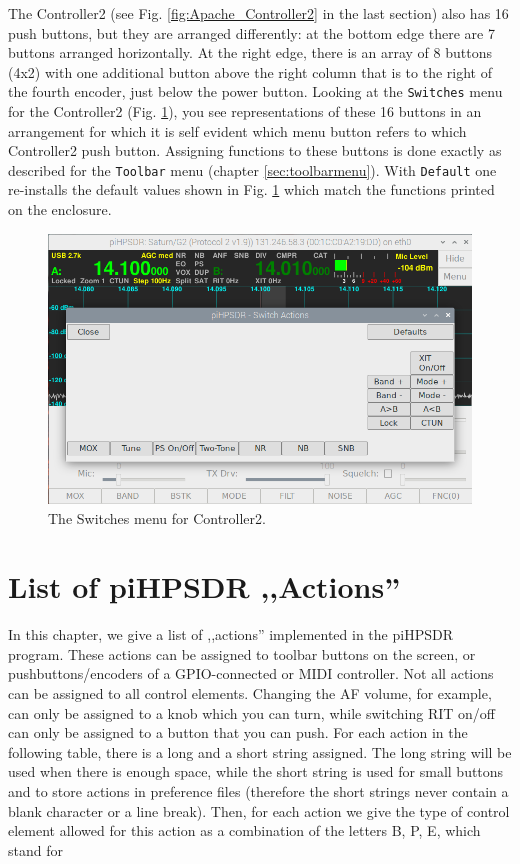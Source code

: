 \documentclass[12pt]{book}
\def\rett#1{\texttt{\color{red}#1}}
\def\bltt#1{\texttt{\color{blue}#1}}
\begin{document}
The Controller2 (see Fig. \ref{fig:Apache_Controller2} in the last section)
also has 16 push buttons, but they are arranged differently:
at the bottom edge there are 7 buttons arranged horizontally. At the right
edge, there is an array of 8 buttons (4x2) with one additional button
above the right column that is to the right of the fourth encoder, just
below the power button. Looking at the \bltt{Switches} menu for the
Controller2 (Fig. \ref{fig:SwitchMenuV2}), you see representations of
these 16 buttons in an arrangement for which it is self evident which
menu button refers to which Controller2 push button.
Assigning functions
to these buttons is done exactly as described for the \bltt{Toolbar} menu
(chapter \ref{sec:toolbarmenu}).
With \rett{Default} one re-installs the default values
shown in Fig. \ref{fig:SwitchMenuV2} which match the functions printed on the enclosure.

\begin{figure}[ht]
\center
\includegraphics[width=12cm]{SwitchMenuV2.png}
\caption{The Switches menu for Controller2.}
\label{fig:SwitchMenuV2}
\end{figure}


\appendix
\chapter{List of piHPSDR ,,Actions''}
\label{sec:actionlist}

In this chapter, we give a list of ,,actions'' implemented in the piHPSDR program. These actions can be 
assigned to toolbar buttons on the screen, or pushbuttons/encoders of a GPIO-connected or MIDI controller. 
Not all actions can be assigned to all control elements. Changing the AF volume, for example, can only be 
assigned to a knob 
which you can turn, while switching RIT on/off can only be assigned to a button that you can push. For each 
action in the following table, there is a long and a short string assigned. The long string will be used 
when there is enough space, while the short string is used for small buttons and to store actions in 
preference files (therefore the short strings never contain a blank character or a line break). Then, for 
each action we give the type of control element allowed for this action as a combination of the letters B, 
P, E, which stand for
\end{document}

